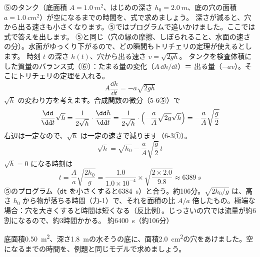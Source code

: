 \begin{phreidai}[タンクが空になるまでの時間]
\label{ph:力-13:ex5}⑤のタンク（底面積 $A=\qty{1.0}{m^2}$、はじめの深さ $h_0=\qty{2.0}{m}$、底の穴の面積 $a=\qty{1.0}{cm^2}$）が空になるまでの時間を、式で求めましょう。
\phbamen
深さが減ると、穴から出る速さも小さくなります。⑤ではプログラムで追いかけました。ここでは式で答えを出します。
\phmushi
⑤と同じ（穴の縁の摩擦、しぼられること、水面の速さの分）。水面がゆっくり下がるので、どの瞬間もトリチェリの定理が使えるとします。
\phzu
時刻 $t$ の深さ $h(t)$、穴から出る速さ $v=\sqrt{2gh}$。
\phriyu
タンクを検査体積にした質量のバランス式（⑥）：たまる量の変化（$A\,\dd h/\dd t$）＝ 出る量（$-av$）。そこにトリチェリの定理を入れる。
\phtateru
\[ A\frac{\dd h}{\dd t}=-a\sqrt{2gh} \]
\phtoku
$\sqrt h$ の変わり方を考えます。合成関数の微分（5-6⑤）で
\[ \frac{\dd}{\dd t}\sqrt h=\frac{1}{2\sqrt h}\cdot\frac{\dd h}{\dd t}=\frac{1}{2\sqrt h}\cdot\Bigl(-\frac{a}{A}\sqrt{2g}\sqrt h\Bigr)=-\frac{a}{A}\sqrt{\frac{g}{2}} \]
右辺は一定なので、$\sqrt h$ は一定の速さで減ります（6-3①）。
\[ \sqrt h=\sqrt{h_0}-\frac{a}{A}\sqrt{\frac{g}{2}}\,t \]
$\sqrt h=0$ になる時刻は
\[ t=\frac{A}{a}\sqrt{\frac{2h_0}{g}}=\frac{1.0}{1.0\times10^{-4}}\times\sqrt{\frac{2\times2.0}{9.8}}\approx\qty{6389}{s} \]
\phtashikame
⑤のプログラム（\texttt{dt} を小さくすると\qty{6384}{s}）と合う。約106分。$\sqrt{2h_0/g}$ は、高さ $h_0$ から物が落ちる時間（力-1）で、それを面積の比 $A/a$ 倍したもの。極端な場合：穴を大きくすると時間は短くなる（反比例）。じっさいの穴では流量が約6割になるので、約3時間かかる。
\kotae 約\qty{6400}{s}（約106分）
\end{phreidai}
\begin{jibun}
底面積\qty{0.50}{m^2}、深さ\qty{1.8}{m}の水そうの底に、面積\qty{2.0}{cm^2}の穴をあけました。空になるまでの時間を、例題と同じモデルで求めましょう。
\end{jibun}

